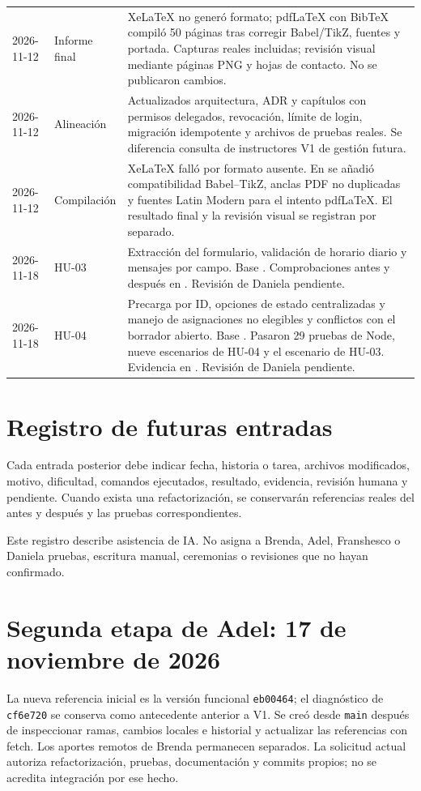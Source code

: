 \begin{longtable}{P{2.2cm}P{2.6cm}P{7.5cm}}
2026-11-12 & Informe final & XeLaTeX no generó formato; pdfLaTeX con BibTeX compiló 50 páginas tras corregir Babel/TikZ, fuentes y portada. Capturas reales incluidas; revisión visual mediante páginas PNG y hojas de contacto. No se publicaron cambios. \\
2026-11-12 & Alineación & Actualizados arquitectura, ADR y capítulos con permisos delegados, revocación, límite de login, migración idempotente y archivos de pruebas reales. Se diferencia consulta de instructores V1 de gestión futura. \\
2026-11-12 & Compilación & XeLaTeX falló por formato ausente. En  se añadió compatibilidad Babel--TikZ, anclas PDF no duplicadas y fuentes Latin Modern para el intento pdfLaTeX. El resultado final y la revisión visual se registran por separado. \\
2026-11-18 & HU-03 & Extracción del formulario, validación de horario diario y mensajes por campo. Base . Comprobaciones antes y después en . Revisión de Daniela pendiente. \\
2026-11-18 & HU-04 & Precarga por ID, opciones de estado centralizadas y manejo de asignaciones no elegibles y conflictos con el borrador abierto. Base . Pasaron 29 pruebas de Node, nueve escenarios de HU-04 y el escenario de HU-03. Evidencia en . Revisión de Daniela pendiente. \\
\bottomrule
\end{longtable}

\section{Registro de futuras entradas}
Cada entrada posterior debe indicar fecha, historia o tarea, archivos modificados, motivo, dificultad, comandos ejecutados, resultado, evidencia, revisión humana y pendiente. Cuando exista una refactorización, se conservarán referencias reales del antes y después y las pruebas correspondientes.

Este registro describe asistencia de IA. No asigna a Brenda, Adel, Franshesco o Daniela pruebas, escritura manual, ceremonias o revisiones que no hayan confirmado.

\section{Segunda etapa de Adel: 17 de noviembre de 2026}
La nueva referencia inicial es la versión funcional \texttt{eb00464}; el diagnóstico de \texttt{cf6e720} se conserva como antecedente anterior a V1. Se creó  desde \texttt{main} después de inspeccionar ramas, cambios locales e historial y actualizar las referencias con fetch. Los aportes remotos de Brenda permanecen separados. La solicitud actual autoriza refactorización, pruebas, documentación y commits propios; no se acredita integración por ese hecho.

